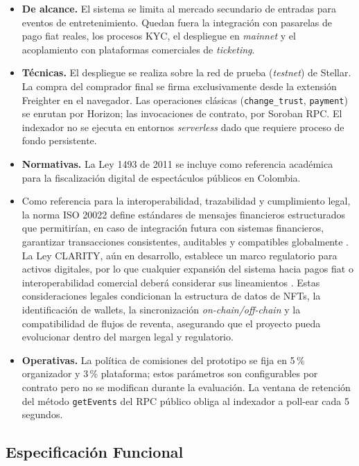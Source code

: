 \begin{itemize}\setlength{\itemsep}{2pt}
    \item \textbf{De alcance.} El sistema se limita al mercado secundario de entradas para eventos de
entretenimiento. Quedan fuera la integración con pasarelas de pago fiat reales, los procesos KYC, el
despliegue en \textit{mainnet} y el acoplamiento con plataformas comerciales de \textit{ticketing}.
    \item \textbf{Técnicas.} El despliegue se realiza sobre la red de prueba (\textit{testnet}) de Stellar.
La compra del comprador final se firma exclusivamente desde la extensión Freighter en el navegador. Las
operaciones clásicas (\texttt{change\_trust}, \texttt{payment}) se enrutan por Horizon; las invocaciones de
contrato, por Soroban RPC. El indexador no se ejecuta en entornos \textit{serverless} dado que requiere
proceso de fondo persistente.
    \item \textbf{Normativas.} La Ley 1493 de 2011 se incluye como referencia académica para la fiscalización
digital de espectáculos públicos en Colombia.
\item Como referencia para la interoperabilidad, trazabilidad y cumplimiento legal, la
norma ISO 20022 define estándares de mensajes financieros estructurados que
permitirían, en caso de integración futura con sistemas financieros, garantizar
transacciones consistentes, auditables y compatibles globalmente
\cite{iso20022}. La Ley CLARITY, aún en desarrollo, establece un marco
regulatorio para activos digitales, por lo que cualquier expansión del sistema
hacia pagos fiat o interoperabilidad comercial deberá considerar sus
lineamientos \cite{clarityact2025}. Estas consideraciones legales condicionan
la estructura de datos de NFTs, la identificación de wallets, la sincronización
\textit{on-chain/off-chain} y la compatibilidad de flujos de reventa,
asegurando que el proyecto pueda evolucionar dentro del margen legal y
regulatorio.

    \item \textbf{Operativas.} La política de comisiones del prototipo se fija en 5\,\% organizador y 3\,\% plataforma; estos parámetros son configurables por contrato pero no se modifican durante la evaluación. La ventana de retención del método \texttt{getEvents} del RPC público obliga al indexador a poll-ear cada 5 segundos.
\end{itemize}

\subsection{Especificación Funcional}

